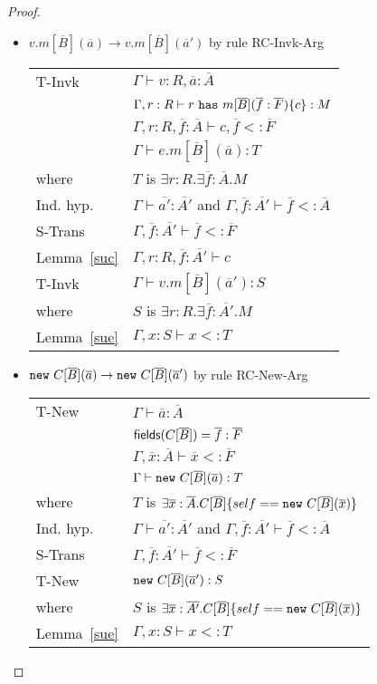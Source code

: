 \begin{proof}
\begin{itemize}
\item $v.m[\overline{B}](\overline{a}) \rightarrow v.m[\overline{B}](\overline{a}')$ by rule {\sc RC-Invk-Arg}
\\
\begin{tabular}{ll}
{\sc T-Invk} & $\Gamma\vdash v:R,\overline{a}:\overline{A}$
\\
& $\Gamma,r:R\vdash r~{\tt has}~m[\overline{B}](\overline{f}:\overline{F})\{c\}:M$
\\
& $\Gamma,r:R,\overline{f}:\overline{A}\vdash c,\overline{f}<:\overline{F}$
\\
& $\Gamma\vdash e.m[\overline{B}](\overline{a}):T$
\\
where & $T$ is $\exists r:R.\exists \overline{f}:\overline{A}.M$
\\
Ind. hyp. & $\Gamma\vdash \overline{a'}:\overline{A'}$ and $\Gamma,\overline{f}:\overline{A'}\vdash\overline{f}<:\overline{A}$
\\
{\sc S-Trans} & $\Gamma,\overline{f}:\overline{A'}\vdash\overline{f}<:\overline{F}$
\\
Lemma~\ref{suc} & $\Gamma,r:R,\overline{f}:\overline{A'}\vdash c$
\\
{\sc T-Invk} & $\Gamma\vdash v.m[\overline{B}](\overline{a}'):S$
\\
where & $S$ is $\exists r:R.\exists \overline{f}:\overline{A'}.M$
\\
Lemma~\ref{sue} & $\Gamma,x:S\vdash x<:T$
\end{tabular}


\item ${\tt new}~C[\overline{B}](\overline{a}) \rightarrow {\tt new}~C[\overline{B}](\overline{a}')$ by rule {\sc RC-New-Arg}
\\
\begin{tabular}{ll}
{\sc T-New} & $\Gamma\vdash\overline{a}:\overline{A}$
\\
& ${\sf fields}(C[\overline{B}])=\overline{f}:\overline{F}$
\\
& $\Gamma,\overline{x}:\overline{A}\vdash \overline{x}<:\overline{F}$
\\
& $\Gamma\vdash{\tt new}~C[\overline{B}](\overline{a}):T$
\\
where & $T$ is $\exists\overline{x}:\overline{A}.C[\overline{B}]\{self=={\tt new}~C[\overline{B}](\overline{x})\}$
\\
Ind. hyp. & $\Gamma\vdash \overline{a'}:\overline{A'}$ and $\Gamma,\overline{f}:\overline{A'}\vdash\overline{f}<:\overline{A}$
\\
{\sc S-Trans} & $\Gamma,\overline{f}:\overline{A'}\vdash\overline{f}<:\overline{F}$
\\
{\sc T-New} & ${\tt new}~C[\overline{B}](\overline{a}'):S$
\\
where & $S$ is $\exists\overline{x}:\overline{A'}.C[\overline{B}]\{self=={\tt new}~C[\overline{B}](\overline{x})\}$
\\
Lemma~\ref{sue} & $\Gamma,x:S\vdash x<:T$
\end{tabular}


\end{itemize}
\end{proof}
